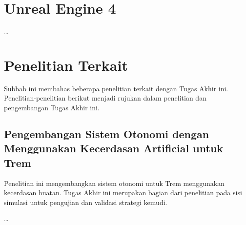 \section{Unreal Engine 4}
\dots

\section{Penelitian Terkait}
Subbab ini membahas beberapa penelitian terkait dengan Tugas Akhir ini.
Penelitian-penelitian berikut menjadi rujukan dalam penelitian dan pengembangan
Tugas Akhir ini.

\subsection{Pengembangan Sistem Otonomi dengan Menggunakan Kecerdasan Artificial untuk Trem}

Penelitian ini mengembangkan sistem otonomi untuk Trem menggunakan kecerdasan
buatan. Tugas Akhir ini merupakan bagian dari penelitian pada sisi simulasi
untuk pengujian dan validasi strategi kemudi.

\dots

